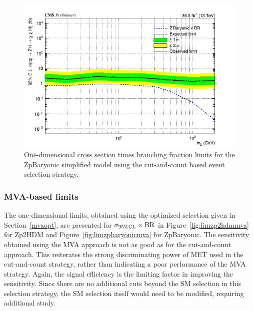 \begin{figure}[tbh]
\centering
\includegraphics[width=6in]{figures/sigma_limits_4mu_ZpBaryonic.png}
\caption{One-dimensional cross section times branching fraction limits for the ZpBaryonic simplified model using the cut-and-count based event selection strategy.}
\label{fig:limzpbaryonic}
\end{figure}

\subsubsection{MVA-based limits}

The one-dimensional limits, obtained using the optimized selection given in Section~\ref{mvaopt}, are presented for $\sigma_{95\% \rm{CL}}\times \rm{BR}$ in Figure~\ref{fig:limzp2hdmmva} for Zp2HDM and Figure~\ref{fig:limzpbaryonicmva} for ZpBaryonic. The sensitivity obtained using the MVA approach is not as good as for the cut-and-count approach. This reiterates the strong discriminating power of MET used in the cut-and-count strategy, rather than indicating a poor performance of the MVA strategy. Again, the signal efficiency is the limiting factor in improving the sensitivity. Since there are no additional cuts beyond the SM selection in this selection strategy, the SM selection itself would need to be modified, requiring additional study. 

